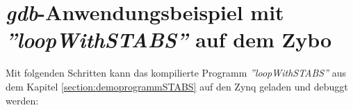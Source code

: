 


\section{\textit{gdb}-Anwendungsbeispiel mit \textit{''loopWithSTABS''} auf dem Zybo}
\label{section:anwendungsbeispielGdb}
Mit folgenden Schritten kann das kompilierte Programm \textit{''loopWithSTABS''} aus dem Kapitel \ref{section:demoprogrammSTABS} auf den Zynq geladen und debuggt werden:

